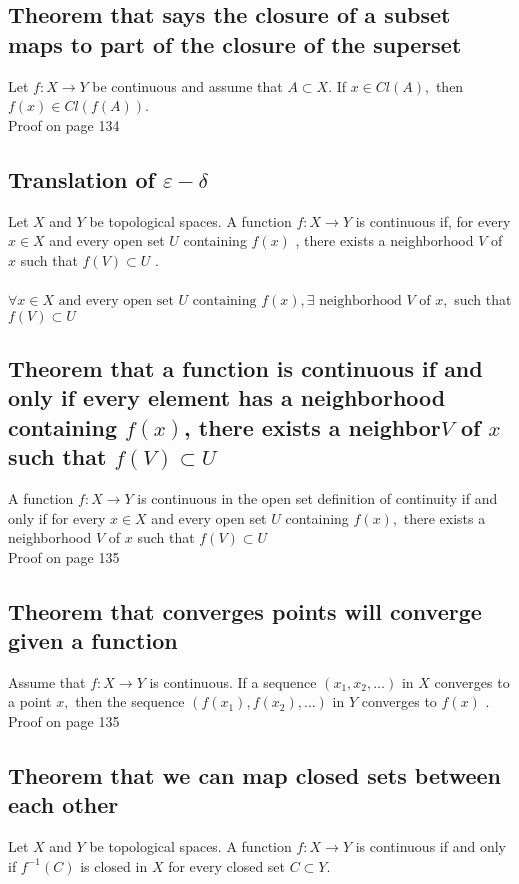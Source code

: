 \documentclass[12pt]{article}
\begin{document}
	\subsection{Theorem that says the closure of a subset maps to part of the closure of the superset}
		Let $f : X \rightarrow Y$ be continuous and assume that $A \subset X .$ If
		$x \in C l ( A ) ,$ then $f ( x ) \in C l ( f ( A ) )$.\\
		\subitem Proof on page 134
		
	\subsection{Translation of $ \varepsilon - \delta $}
		Let $X$ and $Y$ be topological spaces. A function $f : X \rightarrow Y$ is continuous if, for every $x \in X$ and every open set $U$ containing $f ( x )$ , there exists a neighborhood $V$ of $x$ such that $f ( V ) \subset U$ .\\
		\\
		$ \forall x\in X \text{ and every open set } U \text{ containing } f(x), \exists \text{ neighborhood } V \text{ of } x,$ such that $ f(V)\subset U $
	
	\subsection{Theorem that a function is continuous if and only if every element has a neighborhood containing $ f(x) $, there exists a neighbor$ V $ of $ x $ such that $ f(V)\subset U $}
		A function $f : X \rightarrow Y$ is continuous in the open set definition of continuity if and only if for every $x \in X$ and every open set $U$ containing $f ( x ) ,$ there exists a neighborhood $V$ of $x$ such that $f ( V ) \subset U$\\
		\subitem Proof on page 135
	\subsection{Theorem that converges points will converge given a function}
		 Assume that $f : X \rightarrow Y$ is continuous. If a sequence
		$\left( x _ { 1 } , x _ { 2 } , \ldots \right)$ in $X$ converges to a point $x ,$ then the sequence $\left( f \left( x _ { 1 } \right) , f \left( x _ { 2 } \right) , \ldots \right)$
		in $Y$ converges to $f ( x )$ .\\
			\subitem Proof on page 135
	\subsection{Theorem that we can map closed sets between each other}
		Let $X$ and $Y$ be topological spaces. A function $f : X \rightarrow Y$ is continuous if and only if $f ^ { - 1 } ( C )$ is closed in $X$ for every closed set $C \subset Y .$
\end{document}
